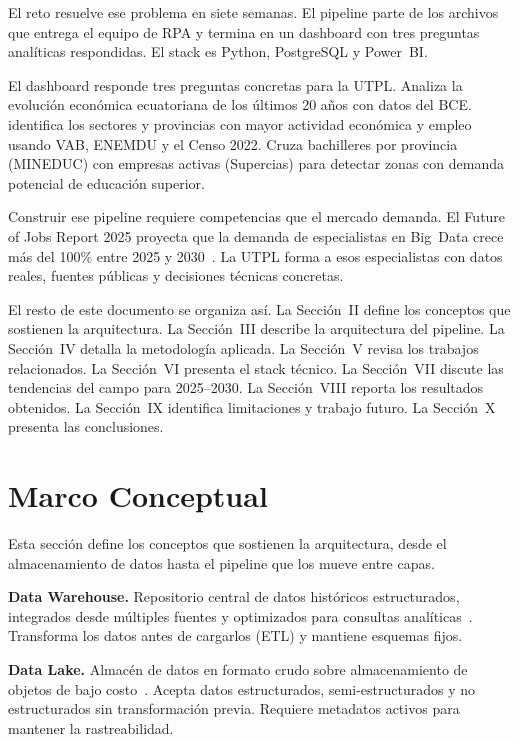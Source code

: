 \documentclass[10pt,twocolumn,spanish]{IEEEtran}
\begin{document}
El reto resuelve ese problema en siete semanas. El pipeline parte
de los archivos que entrega el equipo de RPA y termina en un
dashboard con tres preguntas analíticas respondidas. El stack es
Python, PostgreSQL y Power~BI.

El dashboard responde tres preguntas concretas para la UTPL. 
Analiza la evolución económica ecuatoriana de los últimos 20 años con
datos del BCE. identifica los sectores y provincias con mayor
actividad económica y empleo usando VAB, ENEMDU y el Censo 2022. 
Cruza bachilleres por provincia (MINEDUC) con empresas activas
(Supercias) para detectar zonas con demanda potencial de educación
superior.

Construir ese pipeline requiere competencias que el mercado demanda.
El Future of Jobs Report 2025 proyecta que la demanda de especialistas
en Big~Data crece más del 100\% entre 2025 y 2030~\cite{wef2025}.
La UTPL forma a esos especialistas con datos reales, fuentes públicas
y decisiones técnicas concretas.

El resto de este documento se organiza así.
La Sección~II define los conceptos que sostienen la arquitectura.
La Sección~III describe la arquitectura del pipeline.
La Sección~IV detalla la metodología aplicada.
La Sección~V revisa los trabajos relacionados.
La Sección~VI presenta el stack técnico.
La Sección~VII discute las tendencias del campo para 2025--2030.
La Sección~VIII reporta los resultados obtenidos.
La Sección~IX identifica limitaciones y trabajo futuro.
La Sección~X presenta las conclusiones.

\section{Marco Conceptual}

Esta sección define los conceptos que sostienen la arquitectura,
desde el almacenamiento de datos hasta el pipeline que los mueve
entre capas.

\textbf{Data Warehouse.}
Repositorio central de datos históricos estructurados, integrados
desde múltiples fuentes y optimizados para consultas
analíticas~\cite{nambiar2022}. Transforma los datos antes de
cargarlos (ETL) y mantiene esquemas fijos.

\textbf{Data Lake.}
Almacén de datos en formato crudo sobre almacenamiento de objetos de
bajo costo~\cite{azzabi2024}. Acepta datos estructurados,
semi-estructurados y no estructurados sin transformación previa.
Requiere metadatos activos para mantener la rastreabilidad.
\end{document}
